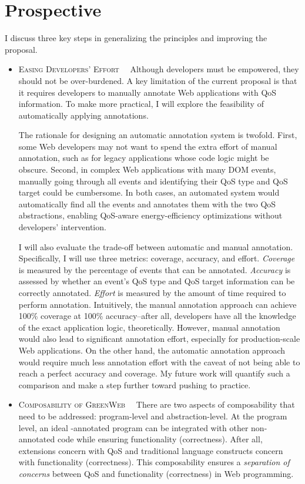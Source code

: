 \section{Prospective} I discuss three key steps in generalizing the principles and improving the proposal.

\begin{itemize}
  \item \textsc{Easing Developers' Effort~~} Although developers must be empowered, they should not be over-burdened. A key limitation of the current \greenweb proposal is that it requires developers to manually annotate Web applications with QoS information. To make \greenweb more practical, I will explore the feasibility of automatically applying \greenweb annotations.
  
  The rationale for designing an automatic annotation system is twofold. First, some Web developers may not want to spend the extra effort of manual annotation, such as for legacy applications whose code logic might be obscure. Second, in complex Web applications with many DOM events, manually going through all events and identifying their QoS type and QoS target could be cumbersome. In both cases, an automated system would automatically find all the events and annotates them with the two QoS abstractions, enabling QoS-aware energy-efficiency optimizations without developers' intervention.
  
  I will also evaluate the trade-off between automatic and manual annotation. Specifically, I will use three metrics: coverage, accuracy, and effort. \textit{Coverage} is measured by the percentage of events that can be annotated. \textit{Accuracy} is assessed by whether an event's QoS type and QoS target information can be correctly annotated. \textit{Effort} is measured by the amount of time required to perform annotation. Intuitively, the manual annotation approach can achieve 100\% coverage at 100\% accuracy--after all, developers have all the knowledge of the exact application logic, theoretically. However, manual annotation would also lead to significant annotation effort, especially for production-scale Web applications. On the other hand, the automatic annotation approach would require much less annotation effort with the caveat of not being able to reach a perfect accuracy and coverage. My future work will quantify such a comparison and make a step further toward pushing \greenweb to practice.
 
  \item \textsc{Composability of GreenWeb~~} There are two aspects of composability that need to be addressed: program-level and abstraction-level. At the program level, an ideal \greenweb-annotated program can be integrated with other non-annotated code while ensuring functionality (correctness). After all, \greenweb extensions concern with QoS and traditional language constructs concern with functionality (correctness). This composability ensures a \textit{separation of concerns} between QoS and functionality (correctness) in Web programming.
  

\end{itemize}
